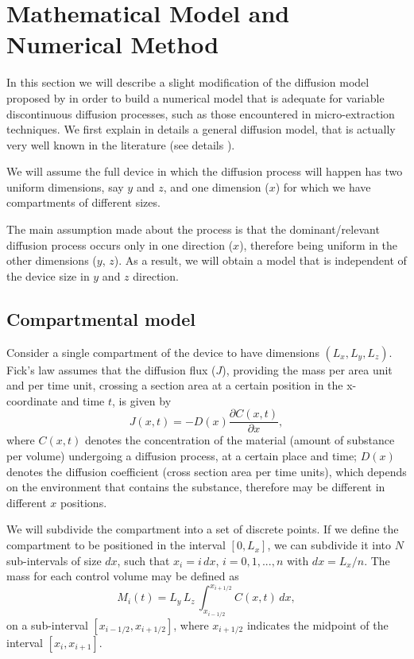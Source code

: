 \documentclass[final,1p,times]{elsarticle}
\begin{document}

\section{Mathematical Model and Numerical Method}
\label{sec:model}

In this section we will describe a slight modification of the diffusion model proposed by \citet{zhang1993headspace} in order to build a numerical model that is adequate for variable discontinuous diffusion processes, such as those encountered in micro-extraction techniques. We first explain in details a general diffusion model, that is actually very well known in the literature (see details \citet{leveque1992numerical}).

We will assume the full device in which the diffusion process will happen has two uniform dimensions, say $y$ and $z$, and one dimension ($x$) for which we have compartments of different sizes. 

The main assumption made about the process is that the dominant/relevant diffusion process occurs only in one direction ($x$), therefore being uniform in the other dimensions ($y$, $z$). As a result, we will obtain a model that is independent of the device size in $y$ and $z$ direction.

\subsection{Compartmental model}

Consider a single compartment of the device to have dimensions $(L_x, L_y, L_z)$. Fick's law assumes that the diffusion flux ($J$), providing the mass per area unit and per time unit, crossing a section area at a certain position in the x-coordinate and time $t$, is given by
\begin{equation}
J(x,t)=-D(x) \frac{\partial C(x,t)}{\partial x},
\end{equation}
where $C(x,t)$ denotes the concentration of the material (amount of substance per volume) undergoing a diffusion process, at a certain place and time; $D(x)$ denotes the diffusion coefficient (cross section area per time units), which depends on the environment that contains the substance, therefore may be different in different $x$ positions.

We will subdivide the compartment into a set of discrete points. If we define the compartment to be positioned in the interval $[0, L_x]$, we can subdivide it into $N$ sub-intervals of size $dx$, such that $x_i=i\,dx$, $i=0, 1, ..., n$ with $dx=L_x/n$. The mass for each control volume may be defined as 
\begin{equation}
M_{i}(t)=L_y\, L_z\,\int_{x_{i-1/2}}^{x_{i+1/2}}C(x,t) \,dx,
\end{equation}
on a sub-interval $[x_{i-1/2}, x_{i+1/2}]$, where $x_{i+1/2}$ indicates the midpoint of the interval $[x_i, x_{i+1}]$.
\end{document}

